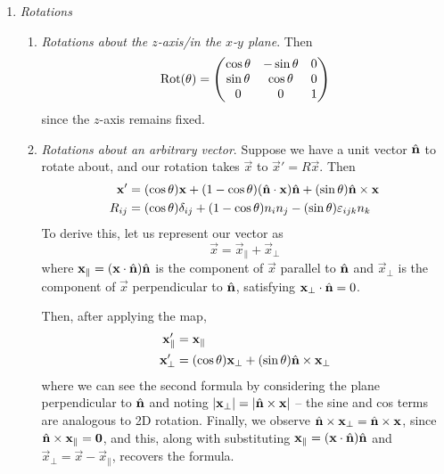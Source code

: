 \documentclass{../template/note}
\begin{document}
    \begin{enumerate}
        \item \emph{Rotations}
        \begin{enumerate}
            \item \emph{Rotations about the \(z\)-axis/in the \(x\)-\(y\) plane}. Then
            \[
                \operatorname{Rot}(\theta) = \begin{pmatrix}
                 \cos \theta & -\sin \theta & 0 \\
                 \sin \theta & \cos \theta & 0 \\
                 0 & 0 & 1 \\
                \end{pmatrix}
            \]
            since the \(z\)-axis remains fixed.
            \item \emph{Rotations about an arbitrary vector}. Suppose we have a unit vector \(\hvec n\) to rotate about, and our rotation takes \(\vec x\) to \(\vec x' = R \vec x\). Then
            \begin{align*}
                \vec x' &= (\cos \theta) \vec x + (1 - \cos \theta) (\hvec n \cdot \vec x) \hvec n + (\sin \theta) \hvec n \times \vec x \\
                R_{ij} &= (\cos \theta) \delta_{ij} + (1 - \cos \theta) n_i n_j - (\sin \theta) \lv{ijk} n_k
            \end{align*}
            To derive this, let us represent our vector as
            \[
                \vec x = \vec x_\parallel + \vec x_\perp
            \]
            where \(\vec x_\parallel = (\vec x \cdot \hvec n) \hvec n\) is the component of \(\vec x\) parallel to \(\hvec n\) and \(\vec x_\perp\) is the component of \(\vec x\) perpendicular to \(\hvec n\), satisfying \(\vec x_\perp \cdot \hvec n = 0\).

            Then, after applying the map,
            \begin{align*}
                \vec x'_\parallel &= \vec x_\parallel \\
                \vec x'_\perp &= (\cos \theta) \vec x_\perp + (\sin \theta) \hvec n \times \vec x_\perp
            \end{align*}
            where we can see the second formula by considering the plane perpendicular to \(\hvec n\) and noting \(|\vec x_\perp| = |\hvec n \times \vec x|\) -- the sine and cos terms are analogous to 2D rotation. Finally, we observe \(\hvec n \times \vec x_\perp = \hvec n \times \vec x\), since \(\hvec n \times \vec x_\parallel = \vec 0\), and this, along with substituting \(\vec x_\parallel = (\vec x \cdot \hvec n) \hvec n\) and \(\vec x_\perp = \vec x - \vec x_\parallel\), recovers the formula.



\end{enumerate}
\end{enumerate}
\end{document}
